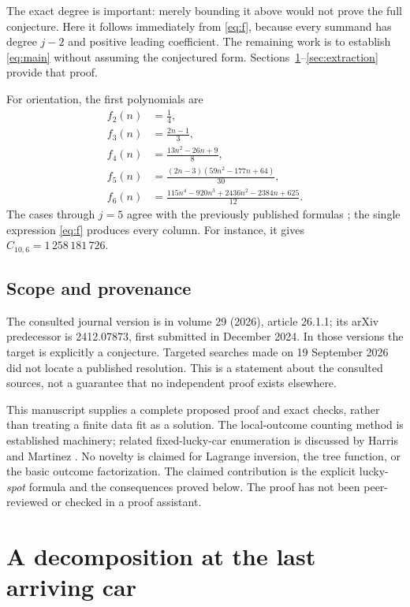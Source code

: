 \documentclass[11pt,letterpaper]{article}
\numberwithin{equation}{section}
\theoremstyle{definition}
\begin{document}
The exact degree is important: merely bounding it above would not prove the
full conjecture. Here it follows immediately from \eqref{eq:f}, because
every summand has degree $j-2$ and positive leading coefficient. The remaining
work is to establish \eqref{eq:main} without assuming the conjectured form.
Sections~\ref{sec:decomposition}--\ref{sec:extraction} provide that proof.

For orientation, the first polynomials are
\begin{align*}
 f_2(n)&=\frac14,\\
 f_3(n)&=\frac{2n-1}{3},\\
 f_4(n)&=\frac{13n^2-26n+9}{8},\\
 f_5(n)&=\frac{(2n-3)(59n^2-177n+64)}{30},\\
 f_6(n)&=\frac{115n^4-920n^3+2436n^2-2384n+625}{12}.
\end{align*}
The cases through $j=5$ agree with the previously published formulas
\cite{butler}; the single expression \eqref{eq:f} produces every column.
For instance, it gives $C_{10,6}=1\,258\,181\,726$.

\subsection{Scope and provenance}
The consulted journal version is in volume 29 (2026), article 26.1.1; its
arXiv predecessor is 2412.07873, first submitted in December 2024. In those
versions the target is explicitly a conjecture. Targeted searches made on
19 September 2026 did not locate a published resolution. This is a statement
about the consulted sources, not a guarantee that no independent proof
exists elsewhere.

This manuscript supplies a complete proposed proof and exact checks, rather
than treating a finite data fit as a solution. The local-outcome counting
method is established machinery; related fixed-lucky-car enumeration is
discussed by Harris and Martinez \cite{harris}. No novelty is claimed for
Lagrange inversion, the tree function, or the basic outcome factorization.
The claimed contribution is the explicit lucky-\emph{spot} formula and the
consequences proved below. The proof has not been peer-reviewed or checked
in a proof assistant.

\section{A decomposition at the last arriving car}
\label{sec:decomposition}
\end{document}
